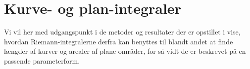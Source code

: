 

\setcounter{chapter}{21} %



%
%
%
%
%
%


\chapter{Kurve- og plan-integraler} \label{tn22}


\begin{basis}
Vi vil her med udgangspunkt i de metoder og resultater der er opstillet i  vise, hvordan Riemann-integralerne derfra kan benyttes til blandt andet at finde længder af kurver og  arealer af plane områder, for så vidt de er beskrevet på en passende parameterform.
\end{basis}








